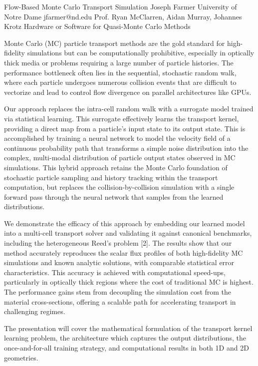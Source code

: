 \begin{talk} 
    {Flow-Based Monte Carlo Transport Simulation}%
    {Joseph Farmer}%
    {University of Notre Dame}%
    {jfarmer@nd.edu}%
    {Prof. Ryan McClarren, Aidan Murray, Johannes Krotz}%
    {Hardware or Software for Quasi-Monte Carlo Methods}%

Monte Carlo (MC) particle transport methods are the gold standard for high-fidelity simulations but can be computationally prohibitive, especially in optically thick media or problems requiring a large number of particle histories. The performance bottleneck often lies in the sequential, stochastic random walk, where each particle undergoes numerous collision events that are difficult to vectorize and lead to control flow divergence on parallel architectures like GPUs.

Our approach replaces the intra-cell random walk with a surrogate model trained via statistical learning. This surrogate effectively learns the transport kernel, providing a direct map from a particle's input state to its output state. This is accomplished by training a neural network to model the velocity field of a continuous probability path that transforms a simple noise distribution into the complex, multi-modal distribution of particle output states observed in MC simulations. This hybrid approach retains the Monte Carlo foundation of stochastic particle sampling and history tracking within the transport computation, but replaces the collision-by-collision simulation with a single forward pass through the neural network that samples from the learned distributions.

We demonstrate the efficacy of this approach by embedding our learned model into a multi-cell transport solver and validating it against canonical benchmarks, including the heterogeneous Reed's problem [2]. The results show that our method accurately reproduces the scalar flux profiles of both high-fidelity MC simulations and known analytic solutions, with comparable statistical error characteristics. This accuracy is achieved with  computational speed-ups, particularly in optically thick regions where the cost of traditional MC is highest. The performance gains stem from decoupling the simulation cost from the material cross-sections, offering a scalable path for accelerating transport in challenging regimes. 

The presentation will cover the mathematical formulation of the transport kernel learning problem, the architecture which captures the output distributions, the once-and-for-all training strategy, and computational  results in both 1D and 2D geometries.



\end{talk}
